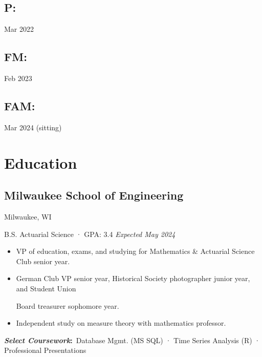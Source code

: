 \documentclass[12pt]{article}
\newcommand{\itemspace}{\vspace{0.1870em}}
\renewcommand{\textsc}[1]{\uppercase{\footnotesize#1}\normalsize}
\newcommand\textbox[1]
    {\parbox{.375\textwidth}{#1}} %
\begin{document}

\textbox{\subsection{P:} {Mar 2022}\hfill}
\textbox{\hfil \subsection{FM:} {Feb 2023}}
\textbox{\hfill\subsection{FAM:} {Mar 2024 (sitting)}}

\itemspace

\section{Education}

\subsection{Milwaukee School of Engineering} \hfill Milwaukee, WI

B.S. Actuarial Science · GPA: 3.4 \hfill \textit{Expected May 2024}

\begin{itemize}[noitemsep,nolistsep]
  \item VP of education, exams, and studying for Mathematics \& Actuarial
    Science Club senior year.

  \item German Club VP senior year, Historical Society photographer junior
    year, and Student Union

    Board treasurer sophomore year.

  \item Independent study on measure theory with mathematics professor.
\end{itemize}

\textbf{\textit{Select Coursework}:} \,Database Mgmt. (\textsc{ms sql}) ·
Time Series Analysis (\textsc{R}) · Professional Presentations

\itemspace

\end{document}
